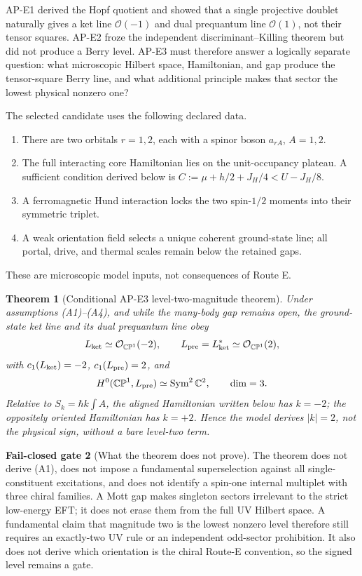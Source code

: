 \documentclass[11pt]{article}
\newtheorem{theorem}{Theorem}[section]
\theoremstyle{definition}
\newtheorem{gate}[theorem]{Fail-closed gate}
\theoremstyle{remark}
\newcommand{\CP}{\mathbb{CP}}
\newcommand{\CC}{\mathbb{C}}
\newcommand{\cO}{\mathcal O}
\newcommand{\Sym}{\operatorname{Sym}}
\begin{document}
AP-E1 derived the Hopf quotient and showed that a single projective doublet
naturally gives a ket line \(\cO(-1)\) and dual prequantum line \(\cO(1)\),
not their tensor squares.  AP-E2 froze the
independent discriminant--Killing theorem but did not produce a Berry level.
AP-E3 must therefore answer a logically separate question: what microscopic
Hilbert space, Hamiltonian, and gap produce the tensor-square Berry line, and
what additional principle makes that sector the lowest physical nonzero one?

The selected candidate uses the following declared data.
\begin{enumerate}[label=(A\arabic*)]
\item There are two orbitals \(r=1,2\), each with a spinor boson
  \(a_{rA}\), \(A=1,2\).
\item The full interacting core Hamiltonian lies on the unit-occupancy
  plateau.  A sufficient condition derived below is
  \(C:=\mu+h/2+J_H/4<U-J_H/8\).
\item A ferromagnetic Hund interaction locks the two spin-\(1/2\) moments into
  their symmetric triplet.
\item A weak orientation field selects a unique coherent ground-state line;
  all portal, drive, and thermal scales remain below the retained gaps.
\end{enumerate}
These are microscopic model inputs, not consequences of Route E.

\begin{theorem}[Conditional AP-E3 level-two-magnitude theorem]
Under assumptions (A1)--(A4), and while the many-body gap remains open, the
ground-state ket line and its dual prequantum line obey
\[
 L_{\rm ket}\simeq\cO_{\CP^1}(-2),\qquad
 L_{\rm pre}=L_{\rm ket}^*\simeq\cO_{\CP^1}(2),
\]
with \(c_1(L_{\rm ket})=-2\), \(c_1(L_{\rm pre})=2\), and
\[
 H^0(\CP^1,L_{\rm pre})\simeq\Sym^2\CC^2,\qquad \dim=3.
\]
Relative to \(S_k=\hbar k\int A\), the aligned Hamiltonian written below has
\(k=-2\); the oppositely oriented Hamiltonian has \(k=+2\).  Hence the model
derives \(|k|=2\), not the physical sign, without a bare level-two term.
\end{theorem}

\begin{gate}[What the theorem does not prove]
The theorem does not derive (A1), does not impose a fundamental superselection
against all single-constituent excitations, and does not identify a spin-one
internal multiplet with three chiral families.  A Mott gap makes singleton
sectors irrelevant to the strict low-energy EFT; it does not erase them from
the full UV Hilbert space.  A fundamental claim that magnitude two is the lowest
nonzero level therefore still requires an exactly-two UV rule or an
independent odd-sector prohibition.  It also does not derive which orientation
is the chiral Route-E convention, so the signed level remains a gate.
\end{gate}
\end{document}
